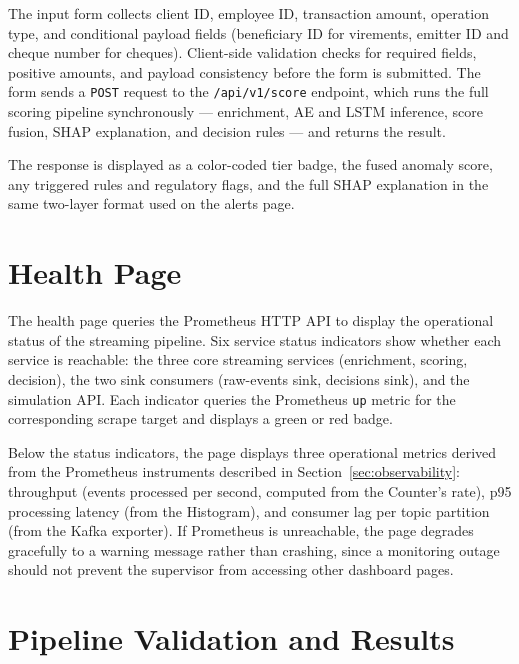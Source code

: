 The input form collects client ID, employee ID, transaction amount,
operation type, and conditional payload fields (beneficiary ID for
virements, emitter ID and cheque number for cheques). Client-side
validation checks for required fields, positive amounts, and payload
consistency before the form is submitted. The form sends a \texttt{POST}
request to the \texttt{/api/v1/score} endpoint, which runs the full
scoring pipeline synchronously --- enrichment, AE and LSTM inference,
score fusion, SHAP explanation, and decision rules --- and returns the
result.

The response is displayed as a color-coded tier badge, the fused anomaly
score, any triggered rules and regulatory flags, and the full SHAP
explanation in the same two-layer format used on the alerts page.


\section{Health Page}
\label{sec:dashboard-health}

The health page queries the Prometheus HTTP API to display the operational
status of the streaming pipeline. Six service status indicators show
whether each service is reachable: the three core streaming services
(enrichment, scoring, decision), the two sink consumers (raw-events sink,
decisions sink), and the simulation API. Each indicator queries the
Prometheus \texttt{up} metric for the corresponding scrape target and
displays a green or red badge.

Below the status indicators, the page displays three operational metrics
derived from the Prometheus instruments described in
Section~\ref{sec:observability}: throughput (events processed per second,
computed from the Counter's rate), p95 processing latency (from the
Histogram), and consumer lag per topic partition (from the Kafka exporter).
If Prometheus is unreachable, the page degrades gracefully to a warning
message rather than crashing, since a monitoring outage should not prevent
the supervisor from accessing other dashboard pages.


\section{Pipeline Validation and Results}
\label{sec:results}

